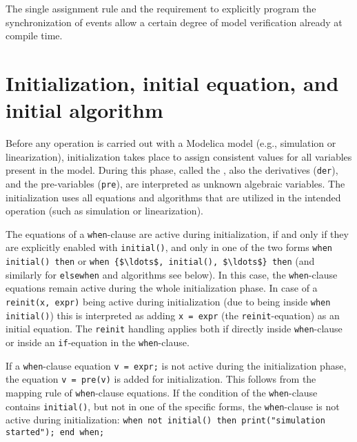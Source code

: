 \begin{nonnormative}
The single assignment rule and the requirement to explicitly program the synchronization of events allow a certain degree of model verification already at compile time.
\end{nonnormative}


\section{Initialization, initial equation, and initial algorithm}\label{initialization-initial-equation-and-initial-algorithm}

Before any operation is carried out with a Modelica model (e.g., simulation or linearization), initialization takes place to assign consistent values for all variables present in the model.
During this phase, called the , also the derivatives (\lstinline!der!), and the pre-variables (\lstinline!pre!), are interpreted as unknown algebraic variables.
The initialization uses all equations and algorithms that are utilized in the intended operation (such as simulation or linearization).

The equations of a \lstinline!when!-clause are active during initialization, if and only if they are explicitly enabled with \lstinline!initial()!, and only in one of the two forms \lstinline!when initial() then! or \lstinline!when {$\ldots$, initial(), $\ldots$} then! (and similarly for \lstinline!elsewhen! and algorithms see below).
In this case, the \lstinline!when!-clause equations remain active during the whole initialization phase.
In case of a \lstinline!reinit(x, expr)! being active during initialization (due to being inside \lstinline!when initial()!) this is interpreted as adding \lstinline!x = expr! (the \lstinline!reinit!-equation) as an initial equation.
The \lstinline!reinit! handling applies both if directly inside \lstinline!when!-clause or inside an \lstinline!if!-equation in the \lstinline!when!-clause.

\begin{nonnormative}
If a \lstinline!when!-clause equation \lstinline!v = expr;! is not active during the initialization phase, the equation \lstinline!v = pre(v)! is added for initialization.
This follows from the mapping rule of \lstinline!when!-clause equations.
If the condition of the \lstinline!when!-clause contains \lstinline!initial()!,
but not in one of the specific forms, the \lstinline!when!-clause is not active during initialization: \lstinline!when not initial() then print("simulation started"); end when;!
\end{nonnormative}

